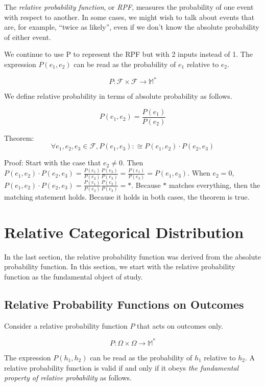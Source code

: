 \documentclass[twoside]{article}
\newcommand{\quotes}[1]{``#1''}
\begin{document}
The \textit{relative probability function}, or \textit{RPF}, measures the probability of one event with respect to another. In some cases, we might wish to talk about events that are, for example, \quotes{twice as likely}, even if we don't know the absolute probability of either event.

We continue to use P to represent the RPF but with 2 inputs instead of 1. The expression \(P(e_1, e_2)\) can be read as the probability of \(e_1\) relative to \(e_2\).

\[P: \mathcal{F} \times \mathcal{F} \rightarrow \mathbb{M}^*\]

We define relative probability in terms of absolute probability as follows.

\[P(e_1, e_2) = \frac{P(e_1)}{P(e_2)}\]

Theorem: \[\forall e_1, e_2, e_3 \in \mathcal{F}, P(e_1, e_3) :\cong P(e_1, e_2) \cdot P(e_2, e_3)\]

Proof: Start with the case that \(e_2 \neq 0\). Then \(P(e_1, e_2) \cdot P(e_2, e_3) = \frac{P(e_1)}{P(e_2)}\frac{P(e_2)}{P(e_3)} = \frac{P(e_1)}{P(e_3)} = P(e_1, e_3)\). When \(e_2 = 0\), \(P(e_1, e_2) \cdot P(e_2, e_3) = \frac{P(e_1)}{P(e_2)}\frac{P(e_2)}{P(e_3)} = \ast\). Because \(\ast\) matches everything, then the matching statement holds. Because it holds in both cases, the theorem is true.

\section{Relative Categorical Distribution}

In the last section, the relative probability function was derived from the absolute probability function. In this section, we start with the relative probability function as the fundamental object of study.

\subsection{Relative Probability Functions on Outcomes}

Consider a relative probability function \(P\) that acts on outcomes only.

\[P: \Omega \times \Omega \rightarrow \mathbb{M}^*\]

The expression \(P(h_1, h_2)\) can be read as the probability of \(h_1\) relative to \(h_2\). A relative probability function is valid if and only if it obeys \textit{the fundamental property of relative probability} as follows.
\end{document}
